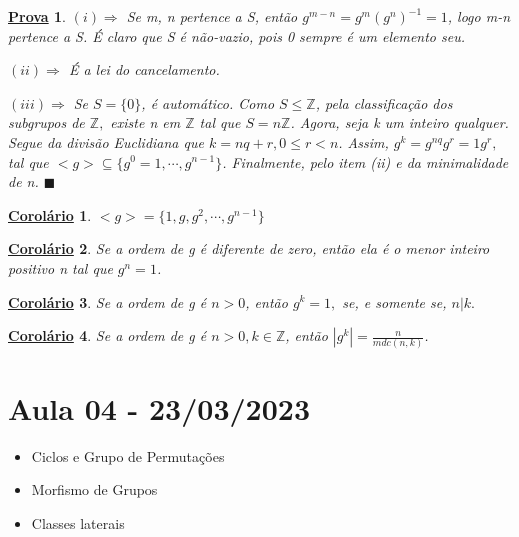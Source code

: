 \documentclass{article}
\newtheorem*{crl*}{\underline{Corol\'ario}}
\newtheorem*{proof*}{\underline{Prova}}
\renewcommand\qedsymbol{$\blacksquare$}
\begin{document}
\begin{proof*}
  $(i)\Rightarrow$ Se m, n pertence a S, ent\~ao $g^{m-n} = g^{m}(g^{n})^{-1} = 1$, logo m-n pertence a S. \'E claro que S \'e n\~ao-vazio, pois 0 sempre \'e um elemento seu.

  $(ii)\Rightarrow$ \'E a lei do cancelamento.

  $(iii)\Rightarrow$ Se $S = \{0\}$, \'e autom\'atico. Como $S\leq{\mathbb{Z}}$, pela classifica\c c\~ao dos subgrupos de $\mathbb{Z},$
existe n em $\mathbb{Z}$ tal que $S = n \mathbb{Z}$. Agora, seja k um inteiro qualquer. Segue da divis\~ao Euclidiana que
$k = nq + r, 0\leq{r}<n$. Assim, $g^{k} = g^{nq}g^{r} = 1g^{r},$ tal que $<g> \subseteq{\{g^{0}=1, \cdots, g^{n-1}\}}$. Finalmente, pelo
item (ii) e da minimalidade de n. \qedsymbol
\end{proof*}
\begin{crl*}
  $<g> = \{1, g, g^{2}, \cdots, g^{n-1}\} $ 
\end{crl*}
\begin{crl*}
  Se a ordem de g \'e diferente de zero, ent\~ao ela \'e o menor inteiro positivo n tal que $g^{n} = 1$.
\end{crl*}
\begin{crl*}
  Se a ordem de g \'e $n>{0}$, ent\~ao $g^{k} = 1,$ se, e somente se, $n|k.$
\end{crl*}
\begin{crl*}
  Se a ordem de g \'e $n>0, k\in \mathbb{Z}$, ent\~ao $|g^{k}|=\displaystyle \frac{n}{mdc(n, k)}$.
\end{crl*}
\newpage

\section{Aula 04 - 23/03/2023}
\begin{itemize}
  \item Ciclos e Grupo de Permuta\c c\~oes
  \item Morfismo de Grupos
  \item Classes laterais
\end{itemize}
\end{document}
